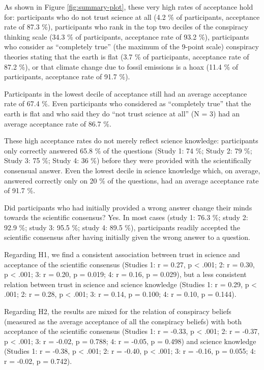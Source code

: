 \documentclass[
  doc,floatsintext]{apa6}
\begin{document}
As shown in Figure \ref{fig:summary-plot}, these very high rates of acceptance hold for: participants who do not trust science at all (4.2 \% of participants, acceptance rate of 87.3 \%), participants who rank in the top two deciles of the conspiracy thinking scale (34.3 \% of participants, acceptance rate of 93.2 \%), participants who consider as ``completely true'' (the maximum of the 9-point scale) conspiracy theories stating that the earth is flat (3.7 \% of participants, acceptance rate of 87.2 \%), or that climate change due to fossil emissions is a hoax (11.4 \% of participants, acceptance rate of 91.7 \%).

Participants in the lowest decile of acceptance still had an average acceptance rate of 67.4 \%. Even participants who considered as ``completely true'' that the earth is flat and who said they do ``not trust science at all'' (N = 3) had an average acceptance rate of 86.7 \%.

These high acceptance rates do not merely reflect science knowledge: participants only correctly answered 65.8 \% of the questions (Study 1: 74 \%; Study 2: 79 \%; Study 3: 75 \%; Study 4: 36 \%) before they were provided with the scientifically consensual answer. Even the lowest decile in science knowledge which, on average, answered correctly only on 20 \% of the questions, had an average acceptance rate of 91.7 \%.

Did participants who had initially provided a wrong answer change their minds towards the scientific consensus? Yes. In most cases (study 1: 76.3 \%; study 2: 92.9 \%; study 3: 95.5 \%; study 4: 89.5 \%), participants readily accepted the scientific consensus after having initially given the wrong answer to a question.

Regarding H1, we find a consistent association between trust in science and acceptance of the scientific consensus (Studies 1: r = 0.27, p \textless{} .001; 2: r = 0.30, p \textless{} .001; 3: r = 0.20, p = 0.019; 4: r = 0.16, p = 0.029), but a less consistent relation between trust in science and science knowledge (Studies 1: r = 0.29, p \textless{} .001; 2: r = 0.28, p \textless{} .001; 3: r = 0.14, p = 0.100; 4: r = 0.10, p = 0.144).

Regarding H2, the results are mixed for the relation of conspiracy beliefs (measured as the average acceptance of all the conspiracy beliefs) with both acceptance of the scientific consensus (Studies 1: r = -0.33, p \textless{} .001; 2: r = -0.37, p \textless{} .001; 3: r = -0.02, p = 0.788; 4: r = -0.05, p = 0.498) and science knowledge (Studies 1: r = -0.38, p \textless{} .001; 2: r = -0.40, p \textless{} .001; 3: r = -0.16, p = 0.055; 4: r = -0.02, p = 0.742).
\end{document}
